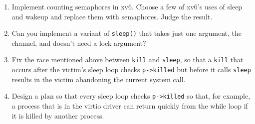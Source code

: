 \begin{enumerate}

\item Implement counting semaphores in xv6.
Choose a few of xv6's uses of sleep and wakeup and
replace them with semaphores.
Judge the result.

\item Can you implement a variant of {\tt sleep()} that
takes just one argument, the channel, and doesn't need
a lock argument?

\item Fix the race mentioned above between
\lstinline{kill}
and 
\lstinline{sleep},
so that a
\lstinline{kill}
that occurs after the victim's sleep loop checks
\lstinline{p->killed}
but before it calls
\lstinline{sleep}
results in the victim abandoning the current system call.

\item Design a plan so that every sleep loop checks 
\lstinline{p->killed}
so that, for example, a process that is in the virtio driver can return quickly from the while loop
if it is killed by another process.

\end{enumerate}
